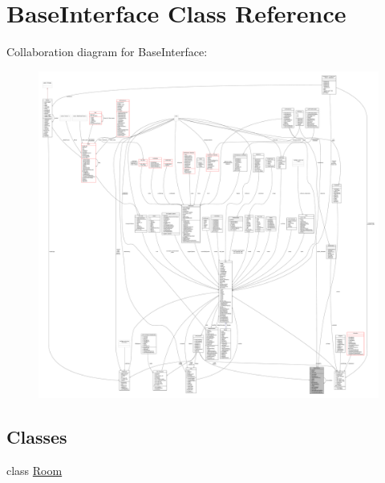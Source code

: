 \hypertarget{classBaseInterface}{}\section{Base\+Interface Class Reference}
\label{classBaseInterface}


Collaboration diagram for Base\+Interface\+:
\nopagebreak
\begin{figure}[H]
\begin{center}
\leavevmode
\includegraphics[width=350pt]{d8/de4/classBaseInterface__coll__graph}
\end{center}
\end{figure}
\subsection*{Classes}
\begin{DoxyCompactItemize}
\item 
class \hyperlink{classBaseInterface_1_1Room}{Room}
\end{DoxyCompactItemize}

